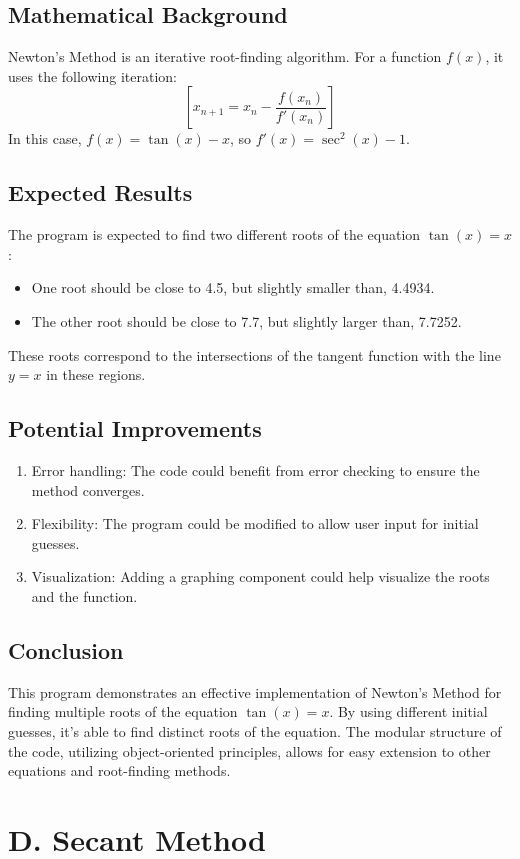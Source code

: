 \documentclass{article}
\begin{document}
\subsection{Mathematical Background}
Newton's Method is an iterative root-finding algorithm. For a function $f(x)$, it uses the following iteration:
$$[ x_{n+1} = x_n - \frac{f(x_n)}{f'(x_n)} ]$$
In this case, $f(x) = \tan(x) - x$, so $f'(x) = \sec^2(x) - 1$.
\subsection{Expected Results}
The program is expected to find two different roots of the equation $\tan(x) = x$:
\begin{itemize}
\item One root should be close to 4.5, but slightly smaller than, 4.4934.
\item The other root should be close to 7.7, but slightly larger than, 7.7252.
\end{itemize}
These roots correspond to the intersections of the tangent function with the line $y = x$ in these regions.
\subsection{Potential Improvements}
\begin{enumerate}
\item Error handling: The code could benefit from error checking to ensure the method converges.
\item Flexibility: The program could be modified to allow user input for initial guesses.
\item Visualization: Adding a graphing component could help visualize the roots and the function.
\end{enumerate}
\subsection{Conclusion}
This program demonstrates an effective implementation of Newton's Method for finding multiple roots of the equation $\tan(x) = x$. By using different initial guesses, it's able to find distinct roots of the equation. The modular structure of the code, utilizing object-oriented principles, allows for easy extension to other equations and root-finding methods.



\section{D. Secant Method}
\end{document}

